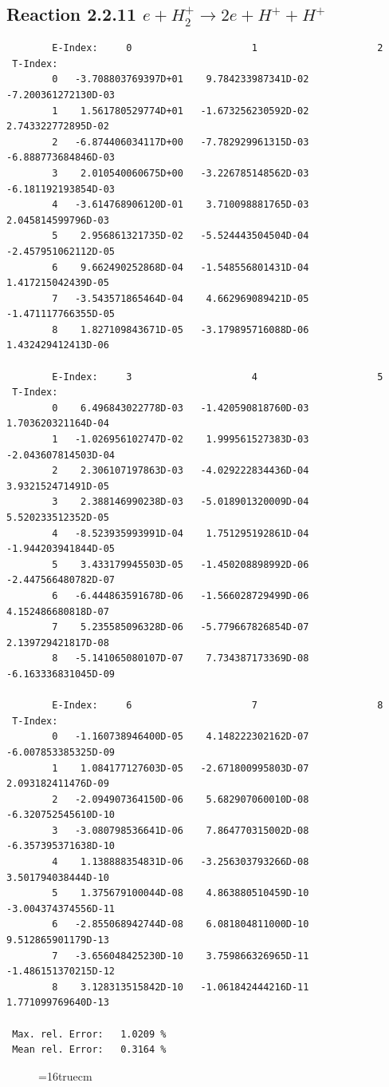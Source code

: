 \documentclass[12pt,dvips]{article}
\begin{document}
\subsection{
Reaction 2.2.11   $e + H_2^+      \rightarrow 2e + H^+ + H^+ $
}


\begin{small}\begin{verbatim}
        E-Index:     0                     1                     2
 T-Index:
        0   -3.708803769397D+01    9.784233987341D-02   -7.200361272130D-03
        1    1.561780529774D+01   -1.673256230592D-02    2.743322772895D-02
        2   -6.874406034117D+00   -7.782929961315D-03   -6.888773684846D-03
        3    2.010540060675D+00   -3.226785148562D-03   -6.181192193854D-03
        4   -3.614768906120D-01    3.710098881765D-03    2.045814599796D-03
        5    2.956861321735D-02   -5.524443504504D-04   -2.457951062112D-05
        6    9.662490252868D-04   -1.548556801431D-04    1.417215042439D-05
        7   -3.543571865464D-04    4.662969089421D-05   -1.471117766355D-05
        8    1.827109843671D-05   -3.179895716088D-06    1.432429412413D-06

        E-Index:     3                     4                     5
 T-Index:
        0    6.496843022778D-03   -1.420590818760D-03    1.703620321164D-04
        1   -1.026956102747D-02    1.999561527383D-03   -2.043607814503D-04
        2    2.306107197863D-03   -4.029222834436D-04    3.932152471491D-05
        3    2.388146990238D-03   -5.018901320009D-04    5.520233512352D-05
        4   -8.523935993991D-04    1.751295192861D-04   -1.944203941844D-05
        5    3.433179945503D-05   -1.450208898992D-06   -2.447566480782D-07
        6   -6.444863591678D-06   -1.566028729499D-06    4.152486680818D-07
        7    5.235585096328D-06   -5.779667826854D-07    2.139729421817D-08
        8   -5.141065080107D-07    7.734387173369D-08   -6.163336831045D-09

        E-Index:     6                     7                     8
 T-Index:
        0   -1.160738946400D-05    4.148222302162D-07   -6.007853385325D-09
        1    1.084177127603D-05   -2.671800995803D-07    2.093182411476D-09
        2   -2.094907364150D-06    5.682907060010D-08   -6.320752545610D-10
        3   -3.080798536641D-06    7.864770315002D-08   -6.357395371638D-10
        4    1.138888354831D-06   -3.256303793266D-08    3.501794038444D-10
        5    1.375679100044D-08    4.863880510459D-10   -3.004374374556D-11
        6   -2.855068942744D-08    6.081804811000D-10    9.512865901179D-13
        7   -3.656048425230D-10    3.759866326965D-11   -1.486151370215D-12
        8    3.128313515842D-10   -1.061842444216D-11    1.771099769640D-13

 Max. rel. Error:   1.0209 %
 Mean rel. Error:   0.3164 %

\end{verbatim}\end{small}
\begin{figure} \label{2.2.11}
\epsfxsize=16truecm
\end{figure}
\newpage
\end{document}
